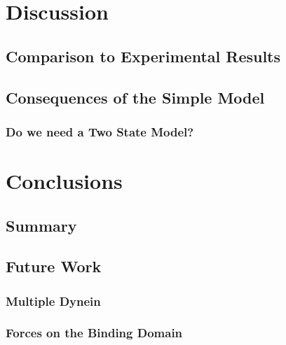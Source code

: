 \documentclass{article}
\begin{document}
\section{Discussion}
\subsection{Comparison to Experimental Results}
\subsection{Consequences of the Simple Model}
\subsubsection{Do we need a Two State Model?}

\section{Conclusions}
\subsection{Summary}
\subsection{Future Work}
\subsubsection{Multiple Dynein}
\subsubsection{Forces on the Binding Domain} 
\end{document}
